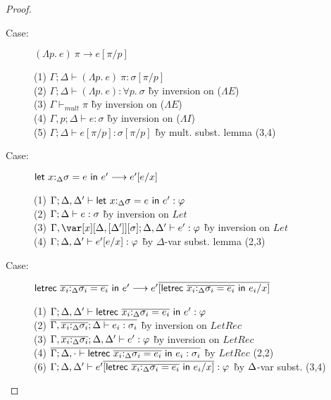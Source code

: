 \begin{proof}
\begin{description}
\item[Case:] $(\Lambda p.~e)~\pi \longrightarrow e[\pi/p]$
\begin{tabbing}
(1) $\Gamma; \Delta \vdash (\Lambda p.~e)~\pi : \sigma[\pi/p]$\\
(2) $\Gamma; \Delta \vdash (\Lambda p.~e) : \forall p.~\sigma$ \` by inversion on ($\Lambda E$) \\
(3) $\Gamma \vdash_{mult} \pi$ \` by inversion on ($\Lambda E$) \\
(4) $\Gamma, p; \Delta \vdash e : \sigma$ \` by inversion on ($\Lambda I$) \\
(5) $\Gamma; \Delta \vdash e[\pi/p]:\sigma[\pi/p]$ \` by mult. subst. lemma (3,4) \\
\end{tabbing}

\item[Case:] $\mathsf{let}~x{:}_\Delta\sigma = e~\mathsf{in}~e'\longrightarrow e'[e/x]$
\begin{tabbing}
(1) $\Gamma; \Delta, \Delta' \vdash \mathsf{let}~x{:}_\Delta\sigma = e~\mathsf{in}~e' : \varphi$\\
(2) $\Gamma; \Delta \vdash e : \sigma$ \` by inversion on $Let$\\
(3) $\G,\xD; \D, \D' \vdash e' : \varphi$ \` by inversion on $Let$ \\
(4) $\Gamma; \Delta, \Delta' \vdash e'[e/x] : \varphi$ \` by $\Delta$-var subst. lemma (2,3)\\
\end{tabbing}

\item[Case:] $\mathsf{letrec}~\overline{x_i{:}_\Delta\sigma_i = e_i}~\mathsf{in}~e'
    \longrightarrow e'\overline{[\mathsf{letrec}~\overline{x_i{:}_\Delta\sigma_i = e_i}~\mathsf{in}~e_i/x]}$
\begin{tabbing}
    (1) $\Gamma; \Delta, \Delta' \vdash \mathsf{letrec}~\overline{x_i{:}_\Delta\sigma_i = e_i}~\mathsf{in}~e' : \varphi$\\
    (2) $\overline{\Gamma,\overline{x_i{:}_\Delta\sigma_i}; \Delta \vdash e_i : \sigma_i}$ \` by inversion on $LetRec$\\
    (3) $\Gamma,\overline{x_i{:}_\Delta\sigma_i}; \Delta, \Delta' \vdash e' : \varphi$ \` by inversion on $LetRec$\\
    (4) $\overline{\Gamma; \Delta, \cdot \vdash \mathsf{letrec}~\overline{x_i{:}_\Delta\sigma_i = e_i}~\mathsf{in}~e_i : \sigma_i}$ \` by $LetRec$ (2,2)\\
    (6) $\Gamma; \Delta, \Delta' \vdash e'\overline{[\mathsf{letrec}~\overline{x_i{:}_\Delta\sigma_i = e_i}~\mathsf{in}~e_i/x]} : \varphi$ \` by $\Delta$-var subst. (3,4)\\
\end{tabbing}


\end{description}
\end{proof}

